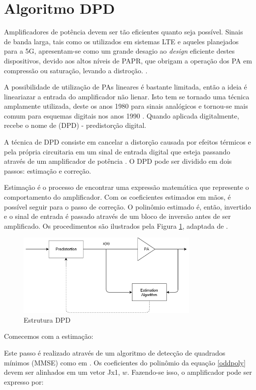 \section{Algoritmo DPD}
Amplificadores de potência devem ser tão eficientes quanto seja possível. Sinais de banda larga, tais como os utilizados em sistemas LTE e aqueles planejados para a 5G, apresentam-se como um grande desagio ao \textit{design} eficiente destes dispositivos, devido aos altos níveis de PAPR, que obrigam a operação dos PA em compressão ou saturação, levando a distroção. \cite{Wood}.  

A possibilidade de utilização de PAs lineares é bastante limitada, então a ideia é lineariazar a entrada do amplificador não lienar. Isto tem se tornado uma técnica amplamente utilizada, deste os anos 1980 para sinais analógicos \cite{Katz} e tornou-se mais comum para esquemas digitais nos anos 1990 \cite{Wood}. Quando aplicada digitalmente, recebe o nome de  (DPD) - predistorção digital.

A técnica de DPD consiste em cancelar a distorção causada por efeitos térmicos e pela própria circuitaria em um sinal de entrada digital que esteja passando através de um amplificador de potência \cite{Dardaillon}. O DPD pode ser dividido em dois passos: estimação e correção.

Estimação é o processo de encontrar uma expressão matemática que represente o comportamento do amplificador. Com os coeficientes estimados em mãos, é possível seguir para o passo de correção. O polinômio estimado é, então, invertido e o sinal de entrada é passado através de um bloco de inversão antes de ser amplificado. 
Os procedimentos são ilustrados pela Figura \ref{FigDPD}, adaptada de \cite{Morgan2006}.

\begin{figure}[h!]
\centering
\includegraphics[width=3.5in]{DPDA.png}
\caption{Estrutura DPD}
\label{FigDPD}
\end{figure} 

Comecemos com a estimação:

Este passo é realizado através de um algoritmo de detecção de quadrados mínimos (MMSE) como em \cite{Morgan2006}. Os coeficientes do polinômio da equação \ref{oddpoly} devem ser alinhados em um vetor Jx1, $w$. Fazendo-se isso, o amplificador pode ser expresso por\cite{Morgan2006}:

